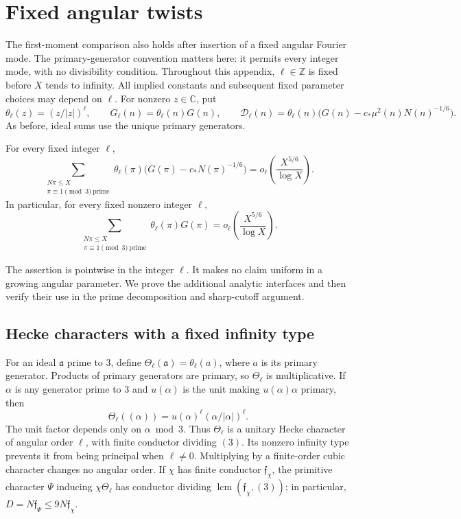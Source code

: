 \section{Fixed angular twists}
\label{sec:angular}

The first-moment comparison also holds after insertion of a fixed
angular Fourier mode. The primary-generator convention matters here:
it permits every integer mode, with no divisibility condition.
Throughout this appendix, $\ell\in\mathbb Z$ is fixed before $X$ tends
to infinity. All implied constants and subsequent fixed parameter
choices may depend on $\ell$.
For nonzero $z\in\mathbb C$, put
\[
 \theta_\ell(z)=(z/|z|)^\ell,\qquad
 G_\ell(n)=\theta_\ell(n)G(n),\qquad
 \mathcal D_\ell(n)=\theta_\ell(n)
       \bigl(G(n)-c_*\mu^2(n)N(n)^{-1/6}\bigr).
\]
As before, ideal sums use the unique primary generators.

\begin{theorem}
\label{thm:angular}
For every fixed integer $\ell$,
\begin{equation}
 \sum_{\substack{N\pi\le X\\\pi\equiv1\pmod3\ \mathrm{prime}}}
 \theta_\ell(\pi)\bigl(G(\pi)-c_*N(\pi)^{-1/6}\bigr)
 =o_\ell\!\left(\frac{X^{5/6}}{\log X}\right).
 \label{eq:angular-comparison}
\end{equation}
In particular, for every fixed nonzero integer $\ell$,
\begin{equation}
 \sum_{\substack{N\pi\le X\\\pi\equiv1\pmod3\ \mathrm{prime}}}
       \theta_\ell(\pi)G(\pi)
 =o_\ell\!\left(\frac{X^{5/6}}{\log X}\right).
 \label{eq:angular-cancellation}
\end{equation}
\end{theorem}

The assertion is pointwise in the integer $\ell$. It makes no claim
uniform in a growing angular parameter. We prove the additional
analytic interfaces and then verify their use in the prime
decomposition and sharp-cutoff argument.

\subsection{Hecke characters with a fixed infinity type}

For an ideal $\mathfrak a$ prime to $3$, define
$\Theta_\ell(\mathfrak a)=\theta_\ell(a)$, where $a$ is its primary
generator. Products of primary generators are primary, so
$\Theta_\ell$ is multiplicative. If $\alpha$ is any generator prime
to $3$ and $u(\alpha)$ is the unit making $u(\alpha)\alpha$ primary,
then
\[
 \Theta_\ell((\alpha))
       =u(\alpha)^\ell(\alpha/|\alpha|)^\ell.
\]
The unit factor depends only on $\alpha\bmod3$. Thus $\Theta_\ell$
is a unitary Hecke character of angular order $\ell$, with finite
conductor dividing $(3)$. Its nonzero infinity type prevents it from
being principal when $\ell\ne0$. Multiplying by a finite-order cubic
character changes no angular order. If $\chi$ has finite conductor
$\mathfrak f_\chi$, the primitive character $\Psi$ inducing
$\chi\Theta_\ell$ has conductor dividing
$\operatorname{lcm}(\mathfrak f_\chi,(3))$; in particular,
$D=N\mathfrak f_\Psi\le9N\mathfrak f_\chi$.


